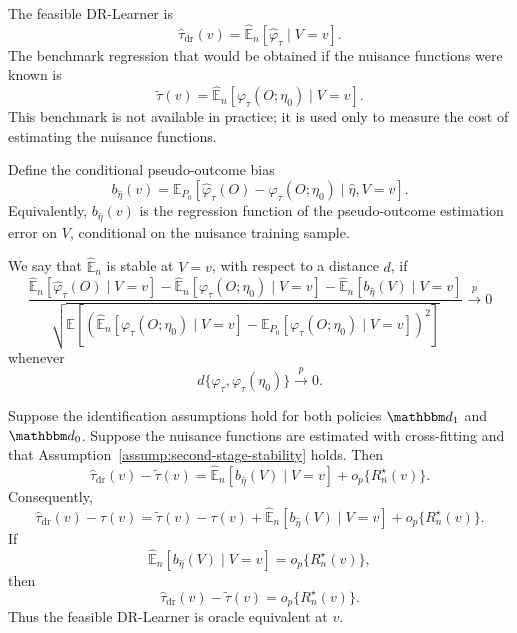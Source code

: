 \documentclass[11pt]{article}
\begin{document}
The feasible DR-Learner is
\[
  \widehat\tau_{\mathrm{dr}}(v)
  =
  \widehat{\mathbb E}_n
  \left[
    \widehat\varphi_\tau
    \mid V=v
  \right].
\]
The benchmark regression that would be obtained if the nuisance functions were
known is
\[
  \widetilde\tau(v)
  =
  \widehat{\mathbb E}_n
  \left[
    \varphi_\tau(O;\eta_0)
    \mid V=v
  \right].
\]
This benchmark is not available in practice; it is used only to measure the
cost of estimating the nuisance functions.

Define the conditional pseudo-outcome bias
\[
  b_{\widehat\eta}(v)
  =
  \mathbb{E}_{P_0}
  \left[
    \widehat\varphi_\tau(O)
    -
    \varphi_\tau(O;\eta_0)
    \mid
    \widehat\eta,V=v
  \right].
\]
Equivalently, \(b_{\widehat\eta}(v)\) is the regression function of the
pseudo-outcome estimation error on \(V\), conditional on the nuisance training
sample.

\begin{assumption}
\label{assump:second-stage-stability}
We say that \(\widehat{\mathbb E}_n\) is stable at \(V=v\), with respect to a
distance \(d\), if
\[
  \frac{
    \widehat{\mathbb E}_n
    \left[
      \widehat\varphi_\tau(O)
      \mid V=v
    \right]
    -
    \widehat{\mathbb E}_n
    \left[
      \varphi_\tau(O;\eta_0)
      \mid V=v
    \right]
    -
    \widehat{\mathbb E}_n
    \left[
      b_{\widehat\eta}(V)
      \mid V=v
    \right]
  }{
    \sqrt{
      \mathbb E
      \left[
        \left(
          \widehat{\mathbb E}_n
          \left[
            \varphi_\tau(O;\eta_0)
            \mid V=v
          \right]
          -
          \mathbb E_{P_0}
          \left[
            \varphi_\tau(O;\eta_0)
            \mid V=v
          \right]
        \right)^2
      \right]
    }
  }
  \overset{p}{\longrightarrow}
  0
\]
whenever
\[
  d\{\widehat\varphi_\tau,\varphi_\tau(\eta_0)\}
  \overset{p}{\longrightarrow}
  0.
\]
\end{assumption}

\begin{theorem}
\label{thm:dr-learner-oracle}
Suppose the identification assumptions hold for both policies
\(\mathbbm d_1\) and \(\mathbbm d_0\). Suppose the nuisance functions are
estimated with cross-fitting and that
Assumption~\ref{assump:second-stage-stability} holds. Then
\[
  \widehat\tau_{\mathrm{dr}}(v)
  -
  \widetilde\tau(v)
  =
  \widehat{\mathbb E}_n
  \left[
    b_{\widehat\eta}(V)
    \mid V=v
  \right]
  +
  o_p\{R_n^\star(v)\}.
\]
Consequently,
\[
  \widehat\tau_{\mathrm{dr}}(v)
  -
  \tau(v)
  =
  \widetilde\tau(v)
  -
  \tau(v)
  +
  \widehat{\mathbb E}_n
  \left[
    b_{\widehat\eta}(V)
    \mid V=v
  \right]
  +
  o_p\{R_n^\star(v)\}.
\]
If
\[
  \widehat{\mathbb E}_n
  \left[
    b_{\widehat\eta}(V)
    \mid V=v
  \right]
  =
  o_p\{R_n^\star(v)\},
\]
then
\[
  \widehat\tau_{\mathrm{dr}}(v)
  -
  \widetilde\tau(v)
  =
  o_p\{R_n^\star(v)\}.
\]
Thus the feasible DR-Learner is oracle equivalent at \(v\).
\end{theorem}
\end{document}
